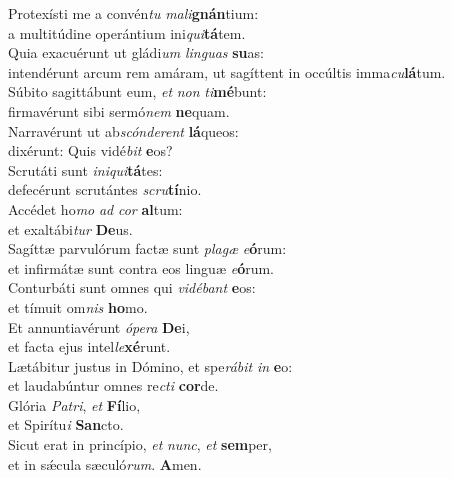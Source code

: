 \evenverse Protexísti me a convén\textit{tu} \textit{ma}\textit{li}\textbf{gnán}tium:~\*\\
\evenverse a multitúdine operántium ini\textit{qui}\textbf{tá}tem.\\
\oddverse Quia exacuérunt ut gládi\textit{um} \textit{lin}\textit{guas} \textbf{su}as:~\*\\
\oddverse intendérunt arcum rem amáram, ut sagíttent in occúltis imma\textit{cu}\textbf{lá}tum.\\
\evenverse Súbito sagittábunt eum, \textit{et} \textit{non} \textit{ti}\textbf{mé}bunt:~\*\\
\evenverse firmavérunt sibi sermó\textit{nem} \textbf{ne}quam.\\
\oddverse Narravérunt ut ab\textit{scón}\textit{de}\textit{rent} \textbf{lá}queos:~\*\\
\oddverse dixérunt: Quis vidé\textit{bit} \textbf{e}os?\\
\evenverse Scrutáti sunt \textit{i}\textit{ni}\textit{qui}\textbf{tá}tes:~\*\\
\evenverse defecérunt scrutántes \textit{scru}\textbf{tí}nio.\\
\oddverse Accédet ho\textit{mo} \textit{ad} \textit{cor} \textbf{al}tum:~\*\\
\oddverse et exaltábi\textit{tur} \textbf{De}us.\\
\evenverse Sagíttæ parvulórum factæ sunt \textit{pla}\textit{gæ} \textit{e}\textbf{ó}rum:~\*\\
\evenverse et infirmátæ sunt contra eos linguæ \textit{e}\textbf{ó}rum.\\
\oddverse Conturbáti sunt omnes qui \textit{vi}\textit{dé}\textit{bant} \textbf{e}os:~\*\\
\oddverse et tímuit om\textit{nis} \textbf{ho}mo.\\
\evenverse Et annuntiavérunt \textit{ó}\textit{pe}\textit{ra} \textbf{De}i,~\*\\
\evenverse et facta ejus intel\textit{le}\textbf{xé}runt.\\
\oddverse Lætábitur justus in Dómino, et spe\textit{rá}\textit{bit} \textit{in} \textbf{e}o:~\*\\
\oddverse et laudabúntur omnes re\textit{cti} \textbf{cor}de.\\
\evenverse Glória \textit{Pa}\textit{tri}, \textit{et} \textbf{Fí}lio,~\*\\
\evenverse et Spirítu\textit{i} \textbf{San}cto.\\
\oddverse Sicut erat in princípio, \textit{et} \textit{nunc}, \textit{et} \textbf{sem}per,~\*\\
\oddverse et in sǽcula sæculó\textit{rum}. \textbf{A}men.\\
